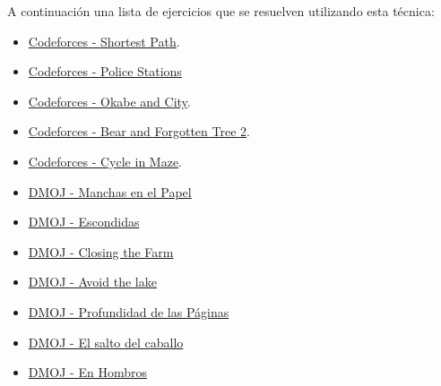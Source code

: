 A continuación una lista de ejercicios que se resuelven utilizando esta técnica:

\begin{itemize}
	\item \href{http://codeforces.com/contest/59/problem/E} {Codeforces - Shortest Path}. 
	\item \href{http://codeforces.com/contest/796/problem/D} {Codeforces - Police Stations} 
	\item \href{http://codeforces.com/contest/821/problem/D} {Codeforces - Okabe and City}. 
	\item \href{http://codeforces.com/contest/653/problem/E} {Codeforces - Bear and Forgotten Tree 2}.
	\item \href{http://codeforces.com/contest/769/problem/C} {Codeforces - Cycle in Maze}. 
	\item \href{https://dmoj.uclv.edu.cu/problem/blots}{DMOJ - Manchas en el Papel} 
	\item \href{https://dmoj.uclv.edu.cu/problem/hideseek}{DMOJ - Escondidas} 
	\item \href{https://dmoj.uclv.edu.cu/problem/closing}{DMOJ - Closing the Farm} 
	\item \href{https://dmoj.uclv.edu.cu/problem/avoidlake}{DMOJ - Avoid the lake}
	\item \href{https://dmoj.uclv.edu.cu/problem/depthpages}{DMOJ - Profundidad de las Páginas}
	\item \href{https://dmoj.uclv.edu.cu/problem/knight}{DMOJ - El salto del caballo}
	\item \href{https://dmoj.uclv.edu.cu/problem/piggyback}{DMOJ - En Hombros}
\end{itemize}